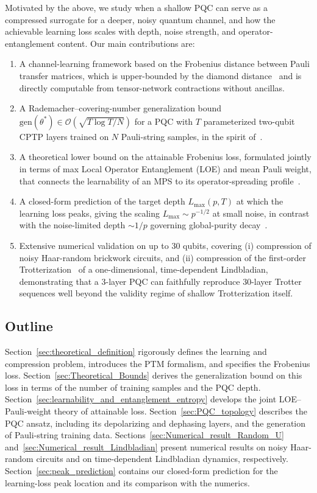 \documentclass[%
 reprint,
superscriptaddress,
 amsmath,amssymb,
 aps,
]{revtex4-2}
\begin{document}
Motivated by the above, we study when a shallow PQC can serve as a compressed surrogate for a deeper, noisy quantum channel, and how the achievable learning loss scales with depth, noise strength, and operator-entanglement content. Our main contributions are:
\begin{enumerate}
    \item A channel-learning framework based on the Frobenius distance between Pauli transfer matrices, which is upper-bounded by the diamond distance~\cite{nielsen2010quantum} and is directly computable from tensor-network contractions without ancillas.
    \item A Rademacher--covering-number generalization bound $\mathrm{gen}(\theta^*)\in\mathcal{O}(\sqrt{T\log T / N})$ for a PQC with $T$ parameterized two-qubit CPTP layers trained on $N$ Pauli-string samples, in the spirit of~\cite{caro2022generalization}.
    \item A theoretical lower bound on the attainable Frobenius loss, formulated jointly in terms of max Local Operator Entanglement (LOE) and mean Pauli weight, that connects the learnability of an MPS to its operator-spreading profile~\cite{nahum2018operator,vonKeyserlingk2018operatorhydrodynamics,prosen2007operator}.
    \item A closed-form prediction of the target depth $L_{\max}(p,T)$ at which the learning loss peaks, giving the scaling $L_{\max}\sim p^{-1/2}$ at small noise, in contrast with the noise-limited depth $\sim 1/p$ governing global-purity decay~\cite{aharonov2023polynomial,deshpande2022tight}.
    \item Extensive numerical validation on up to 30 qubits, covering (i) compression of noisy Haar-random brickwork circuits, and (ii) compression of the first-order Trotterization~\cite{lloyd1996universal} of a one-dimensional, time-dependent Lindbladian, demonstrating that a 3-layer PQC can faithfully reproduce 30-layer Trotter sequences well beyond the validity regime of shallow Trotterization itself.
\end{enumerate}

\subsection*{Outline}

Section~\ref{sec:theoretical_definition} rigorously defines the learning and compression problem, introduces the PTM formalism, and specifies the Frobenius loss. Section~\ref{sec:Theoretical_Bounds} derives the generalization bound on this loss in terms of the number of training samples and the PQC depth. Section~\ref{sec:learnability_and_entanglement_entropy} develops the joint LOE--Pauli-weight theory of attainable loss. Section~\ref{sec:PQC_topology} describes the PQC ansatz, including its depolarizing and dephasing layers, and the generation of Pauli-string training data. Sections~\ref{sec:Numerical_result_Random_U} and~\ref{sec:Numerical_result_Lindbladian} present numerical results on noisy Haar-random circuits and on time-dependent Lindbladian dynamics, respectively. Section~\ref{sec:peak_prediction} contains our closed-form prediction for the learning-loss peak location and its comparison with the numerics.
\end{document}
